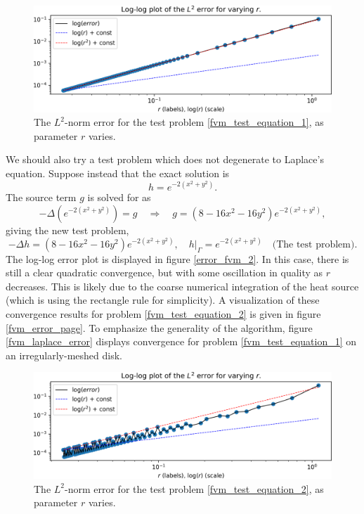 \begin{figure}[H]
    \begin{center}
        \includegraphics[width=1\linewidth]{figures/graphs/error_metric_file_square_fixup.png}
    \end{center}
    \caption{
        The $L^2$-norm error for the test problem \eqref{fvm_test_equation_1}, as parameter $r$ varies.
    }
    \label{error_fvm_1}
\end{figure}


We should also try a test problem which does not degenerate to Laplace's equation. Suppose instead that the exact solution is
$$
    h = e^{-2(x^2 + y^2)}.
$$
The source term $g$ is solved for as
$$
    -\Delta\left(e^{-2(x^2 + y^2)}\right) = g \quad \Rightarrow \quad g = \left(8 - 16x^2 - 16y^2\right)e^{-2(x^2 + y^2)},
$$
giving the new test problem,
\begin{equation}\label{fvm_test_equation_2}
    -\Delta h = \left(8 - 16x^2 - 16y^2\right)e^{-2(x^2 + y^2)},
    \quad \left.h\right|_\Gamma = e^{-2(x^2 + y^2)} \quad \text{(The test problem)}.
\end{equation}
The log-log error plot is displayed in figure \eqref{error_fvm_2}. In this case, there is still a clear quadratic convergence,
but with some oscillation in quality as $r$ decreases.
This is likely due to the coarse numerical integration of the heat source (which is using the rectangle rule for simplicity).
A visualization of these convergence results for problem \eqref{fvm_test_equation_2} is given in figure \ref{fvm_error_page}.
To emphasize the generality of the algorithm, figure \ref{fvm_laplace_error} displays convergence for problem \eqref{fvm_test_equation_1}
on an irregularly-meshed disk.

\begin{figure}[H]
    \begin{center}
        \includegraphics[width=1\linewidth]{figures/graphs/error_metric_file_square_2_fixup.png}
    \end{center}
    \caption{
        The $L^2$-norm error for the test problem \eqref{fvm_test_equation_2}, as parameter $r$ varies.
    }
    \label{error_fvm_2}
\end{figure}



